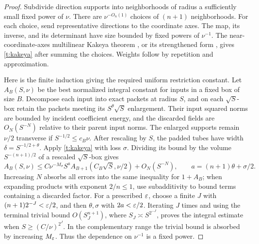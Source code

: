 \begin{proof}
Subdivide direction supports into neighborhoods of radius a sufficiently
small fixed power of $\nu$.  There are $\nu^{-O_n(1)}$ choices of
$(n+1)$ neighborhoods.  For each choice, send representative directions
to the coordinate axes.  The map, its inverse, and its determinant have
size bounded by fixed powers of $\nu^{-1}$.  The near-coordinate-axes
multilinear Kakeya theorem
\citep[Theorem~1.15 and Remark~1.10]{BCT2006}, or its strengthened form
\citep{Guth2010}, gives \eqref{t:kakeya} after summing the choices.
Weights follow by repetition and approximation.

Here is the finite induction giving the required uniform restriction
constant.  Let $A_B(S,\nu)$ be the best normalized integral constant
for inputs in a fixed box of size $B$.  Decompose each input into exact
packets at radius $S$, and on each $\sqrt S$-box retain the packets
meeting its $S^\theta\sqrt S$ enlargement.  Their input squared norms
are bounded by incident coefficient energy, and the discarded fields
are $O_N(S^{-N})$ relative to their parent input norms.  The enlarged
supports remain $\nu/2$ transverse if $S^{-1/2}\le c_B\nu$.
After rescaling by $S$, the padded tubes have width
$\delta=S^{-1/2+\theta}$.  Apply \eqref{t:kakeya} with loss $\sigma$.
Dividing its bound by the volume $S^{-(n+1)/2}$ of a rescaled
$\sqrt S$-box gives
\[
 A_B(S,\nu)\le C\nu^{-M_\sigma}S^a
          A_{B+1}(C_B\sqrt S,\nu/2)+O_N(S^{-N}),
 \qquad a=(n+1)\theta+\sigma/2.
\]
Increasing $N$ absorbs all errors into the same inequality for $1+A_B$;
when expanding products with exponent $2/n\le1$, use subadditivity to
bound terms containing a discarded factor.  For a prescribed $\varepsilon$,
choose a finite $J$ with $(n+1)2^{-J}<\varepsilon/2$, and then $\theta,\sigma$
with $2a<\varepsilon/2$.  Iterating $J$ times and using the terminal trivial
bound $O(S_J^{n+1})$, where $S_J\asymp S^{2^{-J}}$, proves the
integral estimate when $S\ge(C/\nu)^{2^J}$.  In the complementary
range the trivial bound is absorbed by increasing $M_\varepsilon$.
Thus the dependence on $\nu^{-1}$ is a fixed power.


\end{proof}
